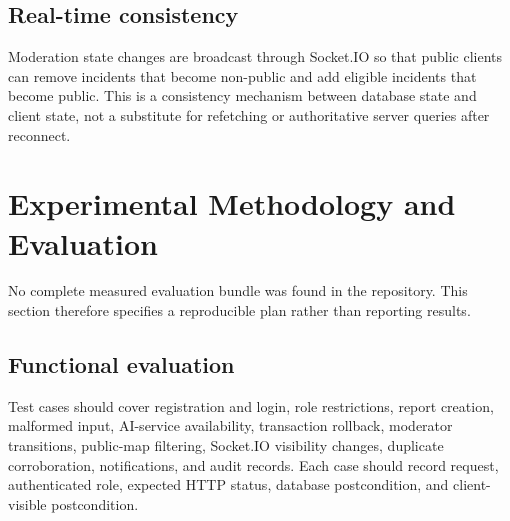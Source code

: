 \documentclass[11pt]{article}
\begin{document}
\subsection{Real-time consistency}

Moderation state changes are broadcast through Socket.IO so that public
clients can remove incidents that become non-public and add eligible
incidents that become public. This is a consistency mechanism between
database state and client state, not a substitute for refetching or
authoritative server queries after reconnect.

\section{Experimental Methodology and Evaluation}
\label{sec:method}

No complete measured evaluation bundle was found in the repository. This
section therefore specifies a reproducible plan rather than reporting
results.

\subsection{Functional evaluation}

Test cases should cover registration and login, role restrictions, report
creation, malformed input, AI-service availability, transaction rollback,
moderator transitions, public-map filtering, Socket.IO visibility changes,
duplicate corroboration, notifications, and audit records. Each case should
record request, authenticated role, expected HTTP status, database
postcondition, and client-visible postcondition.
\end{document}
